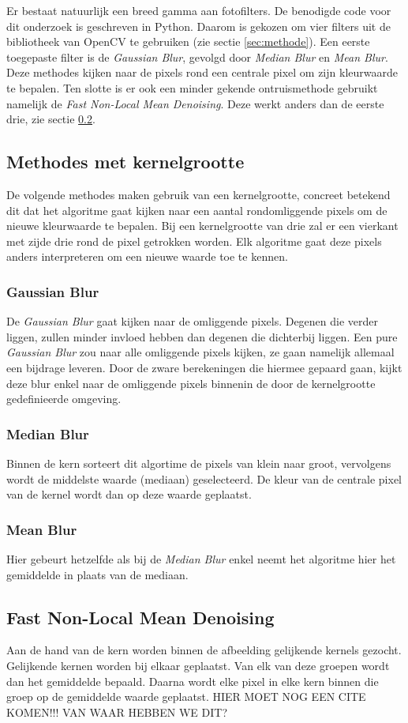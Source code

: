 Er bestaat natuurlijk een breed gamma aan fotofilters. De benodigde code voor dit onderzoek is geschreven in Python. Daarom is gekozen om vier filters uit de bibliotheek van OpenCV te gebruiken (zie sectie \ref{sec:methode}).  Een eerste toegepaste filter is de \textit{Gaussian Blur}, gevolgd door \textit{Median Blur} en \textit{Mean Blur}. Deze methodes kijken naar de pixels rond een centrale pixel om zijn kleurwaarde te bepalen. Ten slotte is er ook een minder gekende ontruismethode gebruikt namelijk de \textit{Fast Non-Local Mean Denoising}. Deze werkt anders dan de eerste drie, zie sectie \ref{subsec:fnlmd}.

\subsection{Methodes met kernelgrootte}
De volgende methodes maken gebruik van een kernelgrootte, concreet betekend dit dat het algoritme gaat kijken naar een aantal rondomliggende pixels om de nieuwe kleurwaarde te bepalen. Bij een kernelgrootte van drie zal er een vierkant met zijde drie rond de pixel getrokken worden. Elk algoritme gaat deze pixels anders interpreteren om een nieuwe waarde toe te kennen.
\subsubsection{Gaussian Blur}
De {\it Gaussian Blur} gaat kijken naar de omliggende pixels. Degenen die verder liggen, zullen minder invloed hebben dan degenen die dichterbij liggen. Een pure {\it Gaussian Blur} zou naar alle omliggende pixels kijken, ze gaan namelijk allemaal een bijdrage leveren. Door de zware berekeningen die hiermee gepaard gaan, kijkt deze blur enkel naar de omliggende pixels binnenin de door de kernelgrootte gedefinieerde omgeving. \cite{gaussianBlur}

\subsubsection{Median Blur}
Binnen de kern sorteert dit algortime de pixels van klein naar groot, vervolgens wordt de middelste waarde (mediaan) geselecteerd. De kleur van de centrale pixel van de kernel wordt dan op deze waarde geplaatst.

\subsubsection{Mean Blur}
Hier gebeurt hetzelfde als bij de {\it Median Blur} enkel neemt het algoritme hier het gemiddelde in plaats van de mediaan.

\subsection{Fast Non-Local Mean Denoising}
\label{subsec:fnlmd}
Aan  de hand van de kern worden binnen de afbeelding gelijkende kernels gezocht. Gelijkende kernen worden bij elkaar geplaatst. Van elk van deze groepen wordt dan het gemiddelde bepaald. Daarna wordt elke pixel in elke kern binnen die groep op de gemiddelde waarde geplaatst. HIER MOET NOG EEN CITE KOMEN!!! VAN WAAR HEBBEN WE DIT?